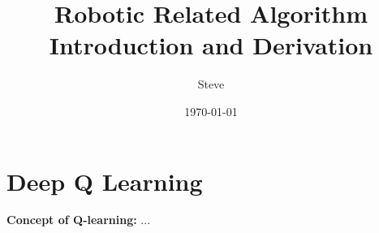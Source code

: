 \documentclass[12pt]{article}
\title{Robotic Related Algorithm Introduction and Derivation}
\author{Steve}
\date{\today}
\begin{document}
 
\maketitle

\section{Deep Q Learning}

\textbf{Concept of Q-learning: } ...









\end{document}
